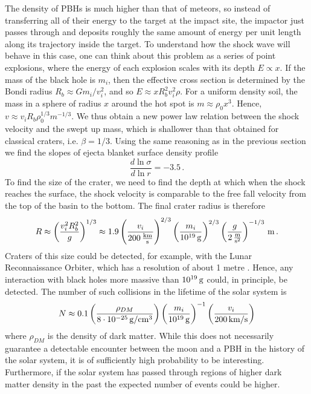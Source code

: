 \documentclass[usenatbib]{mnras}
\begin{document}
The density of PBHs is much higher than that of meteors, so instead of transferring all of their energy to the target at the impact site, the impactor just passes through and deposits roughly the same amount of energy per unit length along its trajectory inside the target. To understand how the shock wave will behave in this case, one can think about this problem as a series of point explosions, where the energy of each explosion scales with its depth $E \propto x$. If the mass of the black hole is $m_i$, then the effective cross section is determined by the Bondi radius $R_b \approx G m_i /v_i^2$, and so $E \approx x R_b^2 v_i^2 \rho$. For a uniform density soil, the mass in a sphere of radius $x$ around the hot spot is $m \approx \rho_0 x^3$. Hence, $v \approx v_i R_b \rho_0^{1/3} m^{-1/3}$. We thus obtain a new power law relation between the shock velocity and the swept up mass, which is shallower than that obtained for classical craters, i.e. $\beta = 1/3$. Using the same reasoning as in the previous section we find the slopes of ejecta blanket surface density profile
\begin{equation}
    \frac{d \ln \sigma}{d \ln r} = -3.5 \, .
\end{equation}
To find the size of the crater, we need to find the depth at which when the shock reaches the surface, the shock velocity is comparable to the free fall velocity from the top of the basin to the bottom. The final crater radius is therefore
\begin{equation}
    R \approx \left(\frac{v_i^2 R_b^2}{g}\right)^{1/3} \approx 1.9 \left(\frac{v_i}{200 \, \rm \frac{km}{s}}\right)^{2/3} \left(\frac{m_i}{10^{19} \, \rm g}\right)^{2/3} \left(\frac{g}{2 \, \rm \frac{m}{s^2}}\right)^{-1/3} \, \rm m \, .
\end{equation}
Craters of this size could be detected, for example, with the Lunar Reconnaissance Orbiter, which has a resolution of about 1 metre
\citep{Robinson2010LunarOverview}. Hence, any interaction with black holes more massive than $10^{19} \, \rm g$ could, in principle, be detected. The number of such collisions in the lifetime of the solar system is
\begin{equation}
    N \approx 0.1 \left(\frac{\rho_{DM}}{8 \cdot 10^{-25} \, \rm g/cm^3}\right) \left(\frac{m_i}{10^{19} \, \rm g}\right)^{-1} \left(\frac{v_i}{200 \, \rm km/s}\right)
\end{equation}
where $\rho_{DM}$ is the density of dark matter. While this does not necessarily guarantee a detectable encounter between the moon and a PBH in the history of the solar system, it is of sufficiently high probability to be interesting. Furthermore, if the solar system has passed through regions of higher dark matter density in the past the expected number of events could be higher. 
\end{document}
